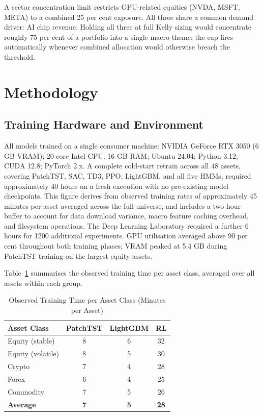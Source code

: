 \documentclass[journal]{IEEEtran}
\begin{document}
A sector concentration limit restricts GPU-related equities (NVDA, MSFT,
META) to a combined 25 per cent exposure. All three share a common demand
driver: AI chip revenue. Holding all three at full Kelly sizing would
concentrate roughly 75 per cent of a portfolio into a single macro theme;
the cap fires automatically whenever combined allocation would otherwise
breach the threshold.

\section{Methodology}
\label{sec:methodology}

\subsection{Training Hardware and Environment}

All models trained on a single consumer machine: NVIDIA GeForce RTX 3050
(6 GB VRAM); 20 core Intel CPU; 16 GB RAM; Ubuntu 24.04; Python 3.12;
CUDA 12.8; PyTorch 2.x. A complete cold-start retrain across all 48
assets, covering PatchTST, SAC, TD3, PPO, LightGBM, and all five HMMs,
required approximately 40 hours on a fresh execution with no pre-existing
model checkpoints. This figure derives from observed training rates of
approximately 45 minutes per asset averaged across the full universe,
and includes a two hour buffer to account for data download variance,
macro feature caching overhead, and filesystem operations. The Deep
Learning Laboratory required a further 6 hours for 1200 additional
experiments. GPU utilisation averaged above 90 per cent throughout both
training phases; VRAM peaked at 5.4 GB during PatchTST training on the
largest equity assets.

Table~\ref{tab:training_breakdown} summarises the observed training time
per asset class, averaged over all assets within each group.

\begin{table}[!t]
\renewcommand{\arraystretch}{1.3}
\caption{Observed Training Time per Asset Class (Minutes per Asset)}
\label{tab:training_breakdown}
\centering
\begin{tabular}{|l|c|c|c|}
\hline
\textbf{Asset Class} & \textbf{PatchTST} & \textbf{LightGBM} & \textbf{RL} \\
\hline
Equity (stable)    & 8  & 6  & 32 \\
Equity (volatile)  & 8  & 5  & 30 \\
Crypto             & 7  & 4  & 28 \\
Forex              & 6  & 4  & 25 \\
Commodity          & 7  & 5  & 26 \\
\hline
\textbf{Average}   & \textbf{7} & \textbf{5} & \textbf{28} \\
\hline
\end{tabular}
\end{table}
\end{document}
